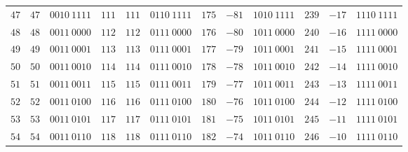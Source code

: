 \begin{center}
\begin{minipage}{0.5\linewidth}
\begin{center}
\begin{tabular}{|c|c|c||c|c|c||c|c|c||c|c|c|}
            \textcolor{numColor}{$47$} & \textcolor{twoColor}{$47$} & $0010~1111$ & \textcolor{numColor}{$111$} & \textcolor{twoColor}{$111$} & $0110~1111$ & \textcolor{numColor}{$175$} & \textcolor{twoColor}{$-81$} & $1010~1111$ & \textcolor{numColor}{$239$} & \textcolor{twoColor}{$-17$} & $1110~1111$\\ 
            \textcolor{numColor}{$48$} & \textcolor{twoColor}{$48$} & $0011~0000$ & \textcolor{numColor}{$112$} & \textcolor{twoColor}{$112$} & $0111~0000$ & \textcolor{numColor}{$176$} & \textcolor{twoColor}{$-80$} & $1011~0000$ & \textcolor{numColor}{$240$} & \textcolor{twoColor}{$-16$} & $1111~0000$\\ 
            \textcolor{numColor}{$49$} & \textcolor{twoColor}{$49$} & $0011~0001$ & \textcolor{numColor}{$113$} & \textcolor{twoColor}{$113$} & $0111~0001$ & \textcolor{numColor}{$177$} & \textcolor{twoColor}{$-79$} & $1011~0001$ & \textcolor{numColor}{$241$} & \textcolor{twoColor}{$-15$} & $1111~0001$\\ 
            \textcolor{numColor}{$50$} & \textcolor{twoColor}{$50$} & $0011~0010$ & \textcolor{numColor}{$114$} & \textcolor{twoColor}{$114$} & $0111~0010$ & \textcolor{numColor}{$178$} & \textcolor{twoColor}{$-78$} & $1011~0010$ & \textcolor{numColor}{$242$} & \textcolor{twoColor}{$-14$} & $1111~0010$\\ 
            \textcolor{numColor}{$51$} & \textcolor{twoColor}{$51$} & $0011~0011$ & \textcolor{numColor}{$115$} & \textcolor{twoColor}{$115$} & $0111~0011$ & \textcolor{numColor}{$179$} & \textcolor{twoColor}{$-77$} & $1011~0011$ & \textcolor{numColor}{$243$} & \textcolor{twoColor}{$-13$} & $1111~0011$\\ 
            \textcolor{numColor}{$52$} & \textcolor{twoColor}{$52$} & $0011~0100$ & \textcolor{numColor}{$116$} & \textcolor{twoColor}{$116$} & $0111~0100$ & \textcolor{numColor}{$180$} & \textcolor{twoColor}{$-76$} & $1011~0100$ & \textcolor{numColor}{$244$} & \textcolor{twoColor}{$-12$} & $1111~0100$\\ 
            \textcolor{numColor}{$53$} & \textcolor{twoColor}{$53$} & $0011~0101$ & \textcolor{numColor}{$117$} & \textcolor{twoColor}{$117$} & $0111~0101$ & \textcolor{numColor}{$181$} & \textcolor{twoColor}{$-75$} & $1011~0101$ & \textcolor{numColor}{$245$} & \textcolor{twoColor}{$-11$} & $1111~0101$\\ 
            \textcolor{numColor}{$54$} & \textcolor{twoColor}{$54$} & $0011~0110$ & \textcolor{numColor}{$118$} & \textcolor{twoColor}{$118$} & $0111~0110$ & \textcolor{numColor}{$182$} & \textcolor{twoColor}{$-74$} & $1011~0110$ & \textcolor{numColor}{$246$} & \textcolor{twoColor}{$-10$} & $1111~0110$\\ 

\end{tabular}
\end{center}
\end{minipage}
\end{center}
